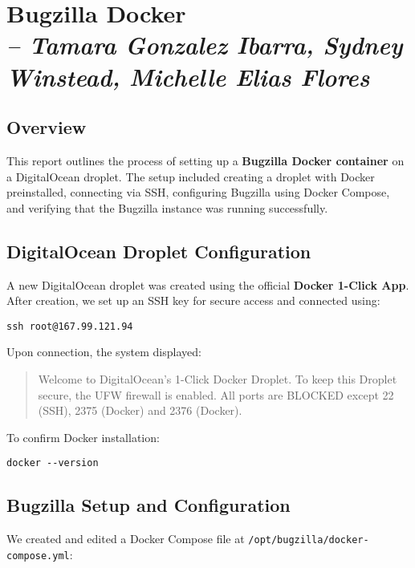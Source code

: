 \chapter{Bugzilla Docker \\
\small{\textit{-- Tamara Gonzalez Ibarra, Sydney Winstead, Michelle Elias Flores}}
}
\label{Chapter::itBugzillaDocker}

\section{Overview}
This report outlines the process of setting up a \textbf{Bugzilla Docker container} on a DigitalOcean droplet. The setup included creating a droplet with Docker preinstalled, connecting via SSH, configuring Bugzilla using Docker Compose, and verifying that the Bugzilla instance was running successfully.

\section{DigitalOcean Droplet Configuration}

A new DigitalOcean droplet was created using the official \textbf{Docker 1-Click App}.  
After creation, we set up an SSH key for secure access and connected using:

\begin{verbatim}
ssh root@167.99.121.94
\end{verbatim}

Upon connection, the system displayed:
\begin{quote}
Welcome to DigitalOcean's 1-Click Docker Droplet.  
To keep this Droplet secure, the UFW firewall is enabled.  
All ports are BLOCKED except 22 (SSH), 2375 (Docker) and 2376 (Docker).
\end{quote}

To confirm Docker installation:
\begin{verbatim}
docker --version
\end{verbatim}

\section{Bugzilla Setup and Configuration}

We created and edited a Docker Compose file at \texttt{/opt/bugzilla/docker-compose.yml}:

